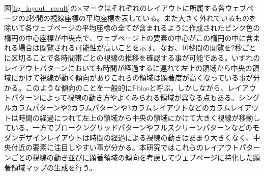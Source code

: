 \par 図\ref{fig_layout_result}の×マークはそれぞれのレイアウトに所属する各ウェブページの2秒間の視線座標の平均座標を表している。また大きく外れているものを除いて各ウェブページの平均座標の全てが含まれるように作成されたピンク色の楕円の中心座標が中央点で、ウェブページ上の要素の中心がこの楕円の中に含まれる場合は閲覧される可能性が高いことを示す。なお、10秒間の閲覧を2秒ごとに区切ることで各時間帯ごとの視線の推移を確認する事が可能である。いずれのレイアウトパターンにおいても時間が経過するに連れて左上の領域から中央の領域にかけて視線が動く傾向がありこれらの領域は顕著度が高くなっている事が分かる。このような傾向のことを一般的にf-biasと呼ぶ。しかしながら、レイアウトパターンによって視線の動き方やよくみられる領域が異なる点もある。シングルカラムパターンや2カラムパターンや3カラムレイアウトなどのカラムレイアウトは時間の経過につれて左上の領域から中央の領域にかけて大きく視線が移動している。一方でブロークングリッドパターンやフルスクリーンパターンなどのモダンデザインレイアウトは時間の経過による視線の動きはあまり大きくなく、中央付近の要素に注目しやすい事が分かる。本研究ではこれらのレイアウトパターンごとの視線の動き並びに顕著領域の傾向を考慮してウェブページに特化した顕著領域マップの生成を行う。
